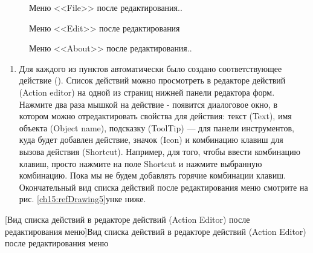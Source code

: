 \begin{figure}[htb]
\caption[Меню <<File>> после редактирования..]{Меню <<File>> после редактирования..}

\end{figure}
\begin{figure}[htb]
\caption[Меню \ <<Edit>> \ после редактирования]{Меню  <<Edit>>  после редактирования}
\label{ch15:refDrawing3}

\end{figure}
\begin{figure}[htb]
\caption[Меню \ <<About>> после редактирования..]{Меню  <<About>> после редактирования..}
\label{ch15:refDrawing4}

\end{figure}
\begin{enumerate}
\item Для каждого из пунктов автоматически было создано соответствующее действие (). Список
действий можно просмотреть в редакторе действий (Action editor) на одной из страниц нижней панели редактора форм.
Нажмите два раза мышкой на действие - появится диалоговое окно, в котором можно отредактировать свойства для действия:
текст (Text), имя объекта  (Object name), подсказку (ToolTip) --- для панели инструментов, куда будет добавлен
действие, значок (Icon) и комбинацию клавиш для вызова действия (Shortcut). Например, для того, чтобы ввести комбинацию
клавиш, просто нажмите на поле Shortcut и нажмите выбранную комбинацию. Пока мы не будем добавлять горячие комбинации
клавиш. Окончательный вид списка действий после редактирования меню смотрите на рис. \ref{ch15:refDrawing5}унке ниже. 
\end{enumerate}
{%
[Вид списка действий в редакторе действий (Action Editor) после редактирования меню]{Вид списка
действий в редакторе действий (Action Editor) после редактирования меню}
\label{ch15:refDrawing5}
\par}

